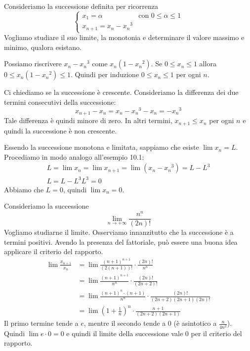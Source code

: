 \begin{example}
Consideriamo la successione definita per ricorrenza
\begin{equation*}
\begin{cases}
x_1 = \alpha & \mbox{con } 0 \le \alpha \le 1 \\
x_{n+1} = x_n - {x_n}^3
\end{cases}
\end{equation*}
Vogliamo studiare il suo limite, la monotonia e determinare il valore massimo e minimo, qualora esistano.

Possiamo riscrivere $x_n - {x_n}^3$ come $x_n(1-{x_n}^2)$. Se $0 \le x_n \le 1$ allora $0 \le x_n(1-{x_n}^2) \le 1$. Quindi per induzione $0 \le x_n \le 1$ per ogni $n$.

Ci chiediamo se la successione è crescente. Consideriamo la differenza dei due termini consecutivi della successione:
\begin{equation*}
x_{n+1}-x_n = x_n - {x_n}^3 - x_n = -{x_n}^3
\end{equation*}
Tale differenza è quindi minore di zero. In altri termini, $x_{n+1} \le x_n$ per ogni $n$ e quindi la successione è non crescente.

Essendo la successione monotona e limitata, sappiamo che esiste $\lim x_n = L$. Procediamo in modo analogo all'esempio 10.1:
\begin{gather*}
L = \lim x_n = \lim x_{n+1} = \lim (x_n-{x_n}^3) = L - L^3 \\
L = L - L^3
L^3 = 0
\end{gather*}
Abbiamo che $L = 0$, quindi $\lim x_n = 0$.
\end{example}

\begin{example}
Consideriamo la successione
\begin{equation*}
\lim_{n \to +\infty} \frac{n^n}{(2n)!}
\end{equation*}
Vogliamo studiarne il limite. Osserviamo innanzitutto che la successione è a termini positivi. Avendo la presenza del fattoriale, può essere una buona idea applicare il criterio del rapporto.
\begin{align*}
\lim \frac{x_{n+1}}{x_n} &= \lim \frac{(n+1)^{n+1}}{(2(n+1))!} \cdot \frac{(2n)!}{n^n} \\
&= \lim \frac{(n+1)^{n+1}}{n^n} \cdot \frac{(2n)!}{(2n+2)!} \\
&= \lim \frac{(n+1)^n \cdot (n+1)}{n^n} \cdot \frac{(2n)!}{(2n+2)(2n+1)(2n)!} \\
&= \lim \left(1 + \frac{1}{n}\right)^n \cdot {\frac{n+1}{(2n+2)(2n+1)}}
\end{align*}
Il primo termine tende a $e$, mentre il secondo tende a 0 (è asintotico a $\frac{n}{4n^2}$). Quindi $\lim e \cdot 0 = 0$ e quindi il limite della successione vale 0 per il criterio del rapporto.
\end{example}

